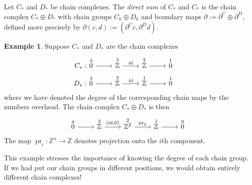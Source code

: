\documentclass{book}
\newcommand{\bbZ}{\mathbb{Z}}
\DeclareMathOperator{\id}{id}
\DeclareMathOperator{\pr}{pr}
\theoremstyle{definition}
\newtheorem{example}[theorem]{Example}
\theoremstyle{remark}
\numberwithin{equation}{section}
\begin{document}
Let $C_*$ and $D_*$ be chain complexes. The \textit{direct sum} of $C_*$ and $C_*$ is the chain complex $C_* \oplus D_*$ with chain groups $C_k \oplus D_k$ and boundary maps $\partial := \partial^C \oplus \partial^D$, defined more precisely by $\partial(c,d) := (\partial^C c, \partial^D d)$.

\begin{example}
    Suppose $C_*$ and $D_*$ are the chain complexes
    \begin{equation} \begin{aligned}
        C_*:  &
        \begin{tikzcd}
            \overset{4}{0} \arrow[r] & \overset{3}{\bbZ} \arrow[r,"\id"] & \overset{2}{\bbZ} \arrow[r] & \overset{1}{0}
        \end{tikzcd}
        & \hphantom{ } \\
        D_*:  &
        \begin{tikzcd}
            \overset{3}{0} \arrow[r] & \overset{2}{\bbZ} \arrow[r,"\id"] & \overset{1}{\bbZ} \arrow[r] & \overset{1}{0}
        \end{tikzcd}
        & \hphantom{ }
    \end{aligned} \end{equation}
    where we have denoted the degree of the corresponding chain maps by the numbers overhead. The chain complex $C_* \oplus D_*$ is then
    \begin{equation}
        \begin{tikzcd}
            \overset{4}{0} \arrow[r] & \overset{3}{\bbZ} \arrow[r,"{(\id,0)}"] & \overset{2}{\bbZ^2} \arrow[r,"\pr_2"] & \overset{1}{\bbZ} \arrow[r] & \overset{0}{0}
        \end{tikzcd}
    \end{equation}
    The map $\pr_i \colon \bbZ^n \to \bbZ$ denotes projection onto the $i$th component. 

    This example stresses the importance of knowing the degree of each chain group. If we had put our chain groups in different positions, we would obtain entirely different chain complexes!
\end{example}
\end{document}
